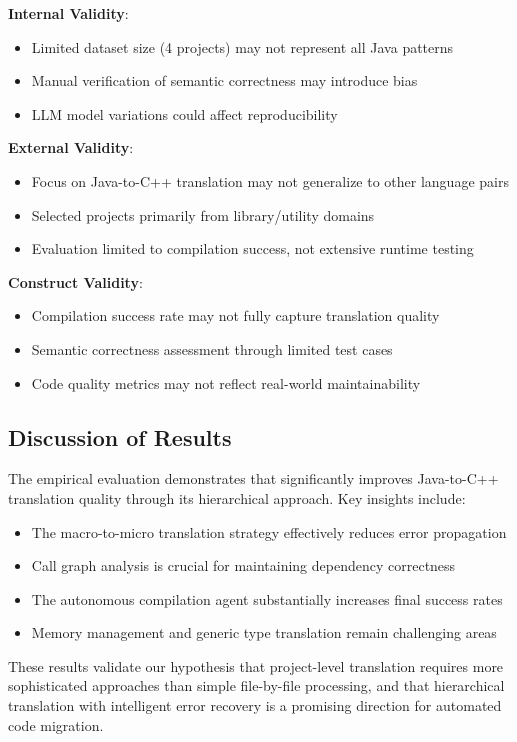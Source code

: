 \textbf{Internal Validity}:
\begin{itemize}
\item Limited dataset size (4 projects) may not represent all Java patterns
\item Manual verification of semantic correctness may introduce bias
\item LLM model variations could affect reproducibility
\end{itemize}

\textbf{External Validity}:
\begin{itemize}
\item Focus on Java-to-C++ translation may not generalize to other language pairs
\item Selected projects primarily from library/utility domains
\item Evaluation limited to compilation success, not extensive runtime testing
\end{itemize}

\textbf{Construct Validity}:
\begin{itemize}
\item Compilation success rate may not fully capture translation quality
\item Semantic correctness assessment through limited test cases
\item Code quality metrics may not reflect real-world maintainability
\end{itemize}

\subsection{Discussion of Results}

The empirical evaluation demonstrates that \tool{} significantly improves Java-to-C++ translation quality through its hierarchical approach. Key insights include:

\begin{itemize}
\item The macro-to-micro translation strategy effectively reduces error propagation
\item Call graph analysis is crucial for maintaining dependency correctness
\item The autonomous compilation agent substantially increases final success rates
\item Memory management and generic type translation remain challenging areas
\end{itemize}

These results validate our hypothesis that project-level translation requires more sophisticated approaches than simple file-by-file processing, and that hierarchical translation with intelligent error recovery is a promising direction for automated code migration.